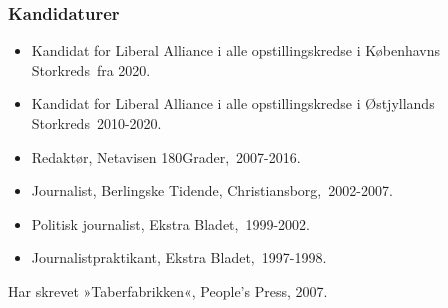 \documentclass[11pt, a4paper]{awesome-cv}
\begin{document}
\begin{cvletter}
\subsubsection*{Kandidaturer}
\begin{itemize}
\item Kandidat for Liberal Alliance i alle opstillingskredse i Københavns Storkreds fra 2020.
\item Kandidat for Liberal Alliance i alle opstillingskredse i Østjyllands Storkreds 2010-2020.
\end{itemize}
\begin{itemize}
\item Redaktør, Netavisen 180Grader, 2007-2016.
\item Journalist, Berlingske Tidende, Christiansborg, 2002-2007.
\item Politisk journalist, Ekstra Bladet, 1999-2002.
\item Journalistpraktikant, Ekstra Bladet, 1997-1998.
\end{itemize}
Har skrevet »Taberfabrikken«, People’s Press, 2007.

\end{cvletter}
\end{document}
